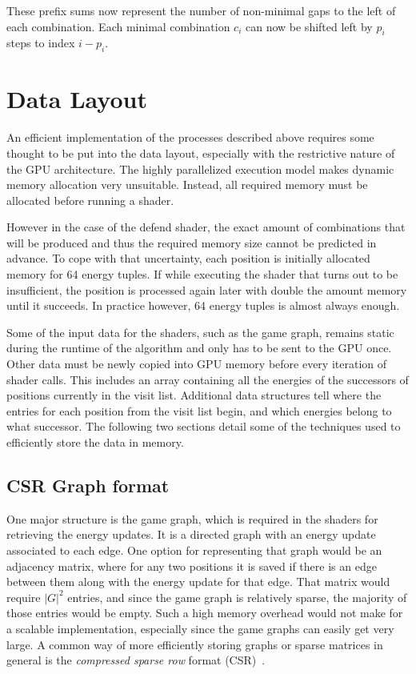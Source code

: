These prefix sums now represent the number of non-minimal gaps to the left of
each combination.
Each minimal combination $c_i$ can now be shifted left by $p_i$ steps to index
$i - p_i$.


\section{Data Layout}

An efficient implementation of the processes described above requires some
thought to be put into the data layout,
especially with the restrictive nature of the GPU architecture.
The highly parallelized execution model makes dynamic memory allocation very
unsuitable.
Instead, all required memory must be allocated before running a shader.

However in the case of the defend shader,
the exact amount of combinations that will be produced
and thus the required memory size cannot be predicted in advance.
To cope with that uncertainty,
each position is initially allocated memory for 64 energy tuples.
If while executing the shader that turns out to be insufficient,
the position is processed again later with double the amount memory until it
succeeds.
In practice however, 64 energy tuples is almost always enough.

Some of the input data for the shaders, such as the game graph,
remains static during the runtime of the algorithm
and only has to be sent to the GPU once.
Other data must be newly copied into GPU memory before every iteration of
shader calls.
This includes an array containing all the energies of the successors of
positions currently in the visit list.
Additional data structures tell where the entries for each position from the
visit list begin,
and which energies belong to what successor.
The following two sections detail some of the techniques used to efficiently
store the data in memory.


\subsection{CSR Graph format}

One major structure is the game graph,
which is required in the shaders for retrieving the energy updates.
It is a directed graph with an energy update associated to each edge.
One option for representing that graph would be an adjacency matrix,
where for any two positions it is saved if there is an edge between them
along with the energy update for that edge.
That matrix would require $|G|^2$ entries, and since the game graph is
relatively sparse, the majority of those entries would be empty.
Such a high memory overhead would not make for a scalable implementation,
especially since the game graphs can easily get very large.
A common way of more efficiently storing graphs or sparse matrices in general is
the \emph{compressed sparse row} format (CSR)~\cite{Merrill2015}\cite{Hijma2023}.

